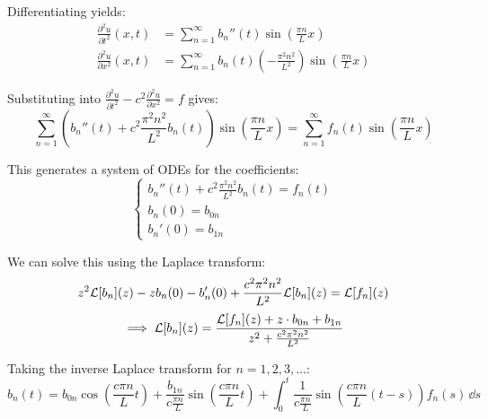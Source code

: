 Differentiating yields:
\begin{align*}
    \frac{\partial^2 u}{\partial t^2}(x,t) &= \sum_{n=1}^{\infty} b_n''(t) \sin\left(\frac{\pi n}{L} x\right) \\
    \frac{\partial^2 u}{\partial x^2}(x,t) &= \sum_{n=1}^{\infty} b_n(t) \left(-\frac{\pi^2 n^2}{L^2}\right) \sin\left(\frac{\pi n}{L} x\right)
\end{align*}

Substituting into $\frac{\partial^2 u}{\partial t^2} - c^2 \frac{\partial^2 u}{\partial x^2} = f$ gives:
\begin{equation*}
    \sum_{n=1}^{\infty} \left( b_n''(t) + c^2 \frac{\pi^2 n^2}{L^2} b_n(t) \right) \sin\left(\frac{\pi n}{L} x\right) = \sum_{n=1}^{\infty} f_n(t) \sin\left(\frac{\pi n}{L} x\right)
\end{equation*}

This generates a system of ODEs for the coefficients:
\begin{equation*}
    \begin{cases}
    b_n''(t) + c^2 \frac{\pi^2 n^2}{L^2} b_n(t) = f_n(t) \\
    b_n(0) = b_{0n} \\
    b_n'(0) = b_{1n}
    \end{cases}
\end{equation*}

We can solve this using the Laplace transform:
\begin{equation*}
    z^2 \mathcal{L}[b_n](z) - z b_n(0) - b_n'(0) + \frac{c^2 \pi^2 n^2}{L^2} \mathcal{L}[b_n](z) = \mathcal{L}[f_n](z)
\end{equation*}
\begin{equation*}
    \implies \mathcal{L}[b_n](z) = \frac{\mathcal{L}[f_n](z) + z \cdot b_{0n} + b_{1n}}{z^2 + \frac{c^2 \pi^2 n^2}{L^2}}
\end{equation*}

Taking the inverse Laplace transform for $n = 1, 2, 3, \dots$:
\begin{equation*}
    b_n(t) = b_{0n} \cos\left(\frac{c\pi n}{L}t\right) + \frac{b_{1n}}{c\frac{\pi n}{L}} \sin\left(\frac{c\pi n}{L}t\right) + \int_0^t \frac{1}{c\frac{\pi n}{L}} \sin\left(\frac{c\pi n}{L}(t-s)\right) f_n(s) \, \dd s
\end{equation*}

